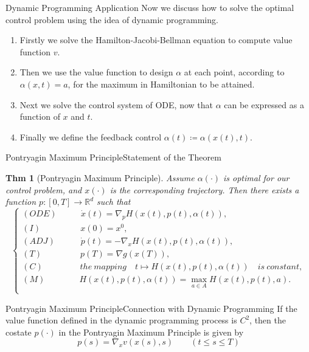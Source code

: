\documentclass[english]{pkuslide}
\newtheorem{Thm}{Thm}
\begin{document}
\begin{frame}{Dynamic Programming} {Application}
Now we discuss how to solve the optimal control problem using the idea of dynamic programming.
\begin{enumerate}[<+->]
\item Firstly we solve the Hamilton-Jacobi-Bellman equation to compute value function $v$.
\item Then we use the value function to design $\alpha$ at each point, according to $\alpha(x,t)=a$, for the maximum in Hamiltonian to be attained.
\item Next we solve the control system of ODE, now that $\alpha$ can be expressed as a function of $x$ and $t$.
\item Finally we define the feedback control $\alpha(t) \coloneqq \alpha(x(t),t)$.
\end{enumerate}
\end{frame}
\begin{frame}{Pontryagin Maximum Principle}{Statement of the Theorem}
\begin{Thm}[Pontryagin Maximum Principle]
Assume $\alpha(\cdot)$ is optimal for our control problem, and $x(\cdot)$ is the corresponding trajectory. Then there exists a function \begin{math} p : [0,T] \to \mathbb{R}^{d} \end{math} such that
\begin{equation}
  \left\{
   \begin{array}{l}
  (ODE) \qquad \,\,\,\,\,\dot{x}(t) = \nabla_{p}{H}(x(t),p(t),\alpha(t)),  \\
   (I) \qquad \qquad \,\,\,\,x(0) = x^0,  \\
   (ADJ) \qquad\,\,\,\,\,\, \dot{p}(t) = -\nabla_{x}{H}(x(t),p(t),\alpha(t)),  \\
   (T) \qquad \qquad \,\,\,p(T) = \nabla g(x(T)),  \\
  (C) \qquad \qquad \,\,the\  mapping \quad t \mapsto H(x(t),p(t),\alpha(t)) \quad is \ constant, \\
   (M) \qquad \qquad H(x(t),p(t),\alpha(t))= \max_{a \in A}{H(x(t),p(t),a)} .  \\
   \end{array}
  \right.
\end{equation} 

\end{Thm}
\end{frame}
\begin{frame}{Pontryagin Maximum Principle}{Connection with Dynamic Programming}
If the value function defined in the dynamic programming process is $C^2$, then the costate $p(\cdot)$ in the Pontryagin Maximum Principle is given by
\begin{equation}
p(s) = \nabla_{x} v(x(s) ,s) \qquad  (t\leq s \leq T)
\end{equation}
\end{frame}
\end{document}
